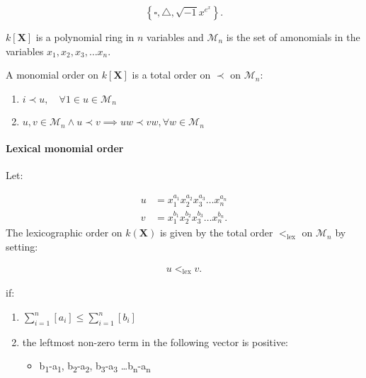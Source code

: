 \documentclass[a4paper,11pt,twoside]{article}
\begin{document}
$$\left\{\square, \triangle, \sqrt{-1} x^{e^x} \right\} 
.$$

\(k\left[ \mathbf{X} \right]\) is a polynomial ring in \(n\) variables and
\(\mathcal{M}_n\) is the set of amonomials in the variables
\(x_1, x_2, x_3, \ldots x_n\).

A monomial order on \(k\left[ \mathbf{X} \right]\) is a total order on
\(\prec\) on \(\mathcal{M}_n\):

\begin{enumerate}
\item \(i \prec u, \quad \forall 1\in u\in \mathcal{M}_n\)

\item \(u, v\in \mathcal{M}_n \land u \prec v \implies uw \prec vw, \forall w \in \mathcal{M}_n\)
\end{enumerate}

\paragraph{Lexical monomial order}
\label{sec:orgca3f61a}
Let:

$$\begin{aligned}
     u &= x_1^{a_1} x_2^{a_2} x_3^{a_3} \ldots x_n^{a_n} \\
     v &= x_1^{b_1} x_2^{b_2} x_3^{b_3} \ldots x_n^{b_n}
 .\end{aligned}$$ The lexicographic order on \(k\left( \mathbf{X} \right)\)
is given by the total order \(<_{\mathrm{lex}}\) on \(\mathcal{M}_n\) by
setting:

$$\begin{aligned}
     u <_{\mathrm{lex}} v
 .\end{aligned}$$

if:

\begin{enumerate}
\item \(\sum^{n}_{i=1}\left[ a_i  \right] \leq \sum^{n}_{i=1}\left[ b_i  \right]\)

\item the leftmost non-zero term in the following vector is positive:

\begin{itemize}
\item b\textsubscript{1}-a\textsubscript{1}, b\textsubscript{2}-a\textsubscript{2}, b\textsubscript{3}-a\textsubscript{3} \ldots{}b\textsubscript{n}-a\textsubscript{n}
\end{itemize}
\end{enumerate}
\end{document}
